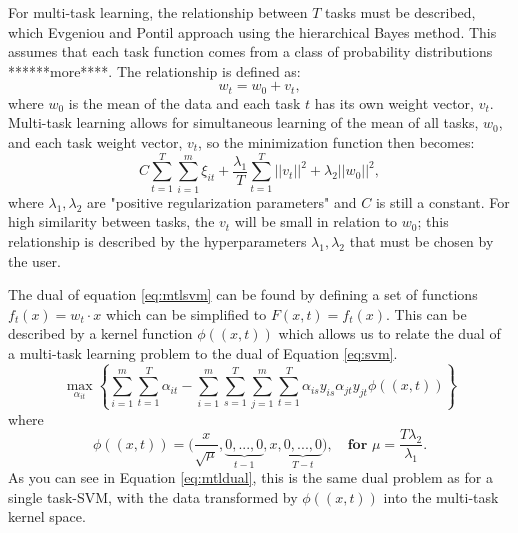 \documentclass{llncs}
\begin{document}
For multi-task learning, the relationship between $T$ tasks must be described, which Evgeniou and Pontil approach using the hierarchical Bayes method. This assumes that each task function comes from a class of probability distributions ******more****.  The relationship is defined as:\\
\begin{equation}
\label{eq:sim}
 w_t = w_0 + v_t ,
\end{equation}
where $w_0$ is the mean of the data and each task $t$ has its own weight vector, $v_t$. Multi-task learning allows for simultaneous learning of the mean of all tasks, $w_0$, and each task weight vector, $v_t$, so the minimization function then becomes:\\
\begin{equation}
\label{eq:mtlsvm}
 C \sum_{t=1}^T \sum_{i=1}^m \xi_{it} + \frac{\lambda_1}{T} \sum_{t=1}^T ||v_t||^2 + \lambda_2||w_0||^2 ,
\end{equation}
where $\lambda_1, \lambda_2$ are "positive regularization parameters" and $C$ is still a constant.  For high similarity between tasks, the $v_t$ will be small in relation to $w_0$; this relationship is described by the hyperparameters $\lambda_1, \lambda_2$ that must be chosen by the user.

The dual of equation \ref{eq:mtlsvm} can be found by defining a set of functions $f_t(x) = w_t \cdot x$ which can be simplified to $F(x,t) = f_t(x)$.  This can be described by a kernel function $\phi((x,t))$ which allows us to relate the dual of a multi-task learning problem to the dual of Equation \ref{eq:svm}.
\begin{equation}
\label{eq:mtldual}
\max_{\alpha_{it}}  \left\{ \sum_{i=1}^m\sum_{t=1}^T \alpha_{it} -  \sum_{i=1}^m\sum_{s=1}^T\sum_{j=1}^m\sum_{t=1}^T  \alpha_{is}y_{is}\alpha_{jt}y_{jt}\phi((x,t))      \right\}
\end{equation}
where
\begin{equation}
\phi((x,t)) = \big(\frac{x}{\sqrt{\mu}}, \underbrace{0,...,0}_{t-1}, x, \underbrace{0,...,0}_{T-t} \big), \quad \textbf{for  } \mu = \frac{T\lambda_2}{\lambda_1} .
\end{equation}
As you can see in Equation \ref{eq:mtldual}, this is the same dual problem as for a single task-SVM, with the data transformed by $\phi((x,t))$ into the multi-task kernel space.
\end{document}
